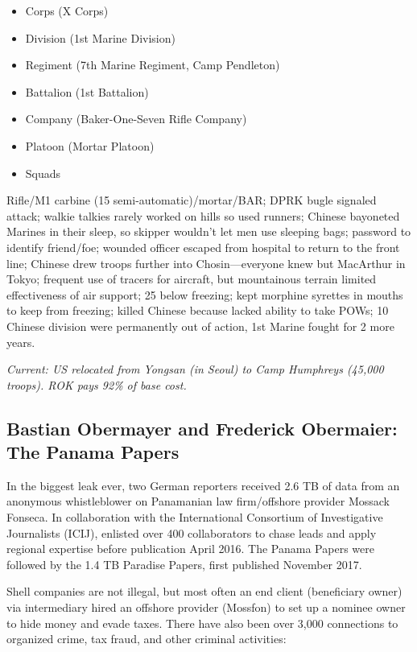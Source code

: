 \documentclass[
]{article}
\begin{document}
\begin{itemize}
\item
  Corps (X Corps)
\item
  Division (1st Marine Division)
\item
  Regiment (7th Marine Regiment, Camp Pendleton)
\item
  Battalion (1st Battalion)
\item
  Company (Baker-One-Seven Rifle Company)
\item
  Platoon (Mortar Platoon)
\item
  Squads
\end{itemize}

Rifle/M1 carbine (15 semi-automatic)/mortar/BAR; DPRK bugle signaled
attack; walkie talkies rarely worked on hills so used runners; Chinese
bayoneted Marines in their sleep, so skipper wouldn't let men use
sleeping bags; password to identify friend/foe; wounded officer escaped
from hospital to return to the front line; Chinese drew troops further
into Chosin---everyone knew but MacArthur in Tokyo; frequent use of
tracers for aircraft, but mountainous terrain limited effectiveness of
air support; 25 below freezing; kept morphine syrettes in mouths to keep
from freezing; killed Chinese because lacked ability to take POWs; 10
Chinese division were permanently out of action, 1st Marine fought for 2
more years.

\emph{Current: US relocated from Yongsan (in Seoul) to Camp Humphreys
(45,000 troops). ROK pays 92\% of base cost.}

\hypertarget{bastian-obermayer-and-frederick-obermaier-the-panama-papers}{%
\subsection{Bastian Obermayer and Frederick Obermaier: The Panama
Papers}\label{bastian-obermayer-and-frederick-obermaier-the-panama-papers}}

In the biggest leak ever, two German reporters received 2.6 TB of data
from an anonymous whistleblower on Panamanian law firm/offshore provider
Mossack Fonseca. In collaboration with the International Consortium of
Investigative Journalists (ICIJ), enlisted over 400 collaborators to
chase leads and apply regional expertise before publication April 2016.
The Panama Papers were followed by the 1.4 TB Paradise Papers, first
published November 2017.

Shell companies are not illegal, but most often an end client
(beneficiary owner) via intermediary hired an offshore provider
(Mossfon) to set up a nominee owner to hide money and evade taxes. There
have also been over 3,000 connections to organized crime, tax fraud, and
other criminal activities:
\end{document}
